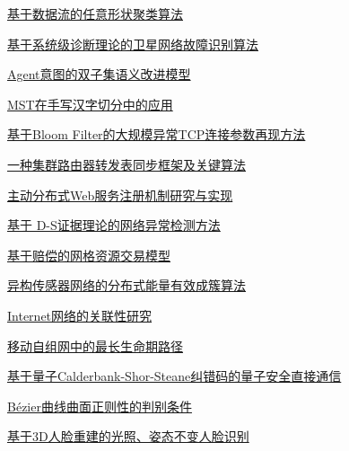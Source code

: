 \documentclass[a4paper]{article}
\begin{document}
\href{http://www.jos.org.cn/ch/reader/download_pdf.aspx?file_no=20060305&year_id=2006&quarter_id=3&falg=1}{基于数据流的任意形状聚类算法}

\href{http://www.jos.org.cn/ch/reader/download_pdf.aspx?file_no=20060306&year_id=2006&quarter_id=3&falg=1}{基于系统级诊断理论的卫星网络故障识别算法}

\href{http://www.jos.org.cn/ch/reader/download_pdf.aspx?file_no=20060307&year_id=2006&quarter_id=3&falg=1}{Agent意图的双子集语义改进模型}

\href{http://www.jos.org.cn/ch/reader/download_pdf.aspx?file_no=20060308&year_id=2006&quarter_id=3&falg=1}{MST在手写汉字切分中的应用}

\href{http://www.jos.org.cn/ch/reader/download_pdf.aspx?file_no=20060311&year_id=2006&quarter_id=3&falg=1}{基于Bloom Filter的大规模异常TCP连接参数再现方法}

\href{http://www.jos.org.cn/ch/reader/download_pdf.aspx?file_no=20060312&year_id=2006&quarter_id=3&falg=1}{一种集群路由器转发表同步框架及关键算法}

\href{http://www.jos.org.cn/ch/reader/download_pdf.aspx?file_no=20060313&year_id=2006&quarter_id=3&falg=1}{主动分布式Web服务注册机制研究与实现}

\href{http://www.jos.org.cn/ch/reader/download_pdf.aspx?file_no=20060314&year_id=2006&quarter_id=3&falg=1}{基于 D-S证据理论的网络异常检测方法}

\href{http://www.jos.org.cn/ch/reader/download_pdf.aspx?file_no=20060315&year_id=2006&quarter_id=3&falg=1}{基于赔偿的网格资源交易模型}

\href{http://www.jos.org.cn/ch/reader/download_pdf.aspx?file_no=20060316&year_id=2006&quarter_id=3&falg=1}{异构传感器网络的分布式能量有效成簇算法}

\href{http://www.jos.org.cn/ch/reader/download_pdf.aspx?file_no=20060317&year_id=2006&quarter_id=3&falg=1}{Internet网络的关联性研究}

\href{http://www.jos.org.cn/ch/reader/download_pdf.aspx?file_no=20060318&year_id=2006&quarter_id=3&falg=1}{移动自组网中的最长生命期路径}

\href{http://www.jos.org.cn/ch/reader/download_pdf.aspx?file_no=20060319&year_id=2006&quarter_id=3&falg=1}{基于量子Calderbank-Shor-Steane纠错码的量子安全直接通信}

\href{http://www.jos.org.cn/ch/reader/download_pdf.aspx?file_no=20060320&year_id=2006&quarter_id=3&falg=1}{Bézier曲线曲面正则性的判别条件}

\href{http://www.jos.org.cn/ch/reader/download_pdf.aspx?file_no=20060321&year_id=2006&quarter_id=3&falg=1}{基于3D人脸重建的光照、姿态不变人脸识别}
\end{document}
